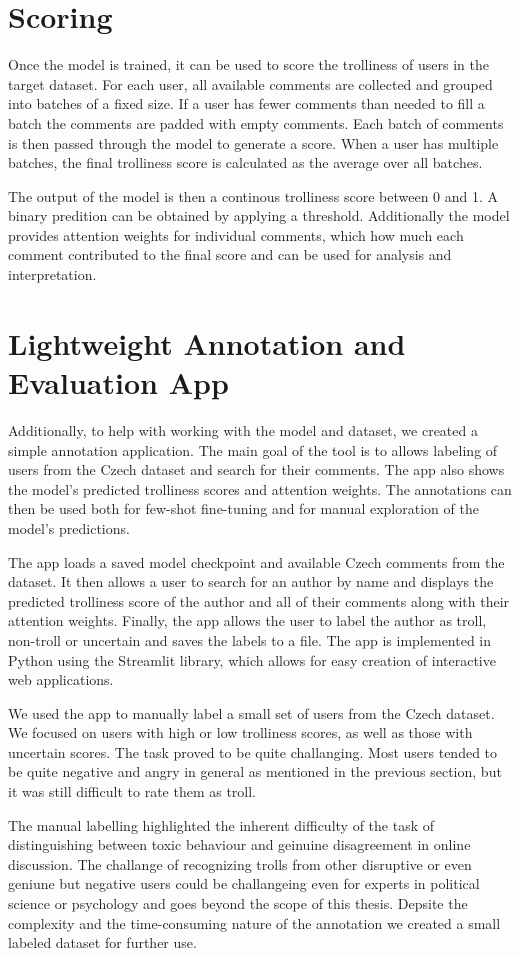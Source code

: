 \documentclass[twoside]{ctuthesis}
\theoremstyle{plain}
\theoremstyle{definition}
\theoremstyle{note}
\begin{document}
\section{Scoring}
Once the model is trained, it can be used to score the trolliness of users in the target dataset. For each user, all available comments are collected and grouped into batches of a fixed size. If a user has fewer comments than needed to fill a batch the comments are padded with empty comments. Each batch of comments is then passed through the model to generate a score. When a user has multiple batches, the final trolliness score is calculated as the average over all batches.\par
The output of the model is then a continous trolliness score between 0 and 1. A binary predition can be obtained by applying a threshold. Additionally the model provides attention weights for individual comments, which how much each comment contributed to the final score and can be used for analysis and interpretation.\par

\section{Lightweight Annotation and Evaluation App}

Additionally, to help with working with the model and dataset, we created a simple annotation application. The main goal of the tool is to allows labeling of users from the Czech dataset and search for their comments. The app also shows the model's predicted trolliness scores and attention weights. The annotations can then be used both for few-shot fine-tuning and for manual exploration of the model's predictions.\par
The app loads a saved model checkpoint and available Czech comments from the dataset. It then allows a user to search for an author by name and displays the predicted trolliness score of the author and all of their comments along with their attention weights. Finally, the app allows the user to label the author as troll, non-troll or uncertain and saves the labels to a file. The app is implemented in Python using the Streamlit library, which allows for easy creation of interactive web applications.\par
We used the app to manually label a small set of users from the Czech dataset. We focused on users with high or low trolliness scores, as well as those with uncertain scores. The task proved to be quite challanging. Most users tended to be quite negative and angry in general as mentioned in the previous section, but it was still difficult to rate them as troll. \par
The manual labelling highlighted the inherent difficulty of the task of distinguishing between toxic behaviour and geinuine disagreement in online discussion. The challange of recognizing trolls from other disruptive or even geniune but negative users could be challangeing even for experts in political science or psychology and goes beyond the scope of this thesis. Depsite the complexity and the time-consuming nature of the annotation we created a small labeled dataset for further use. \par
\end{document}

